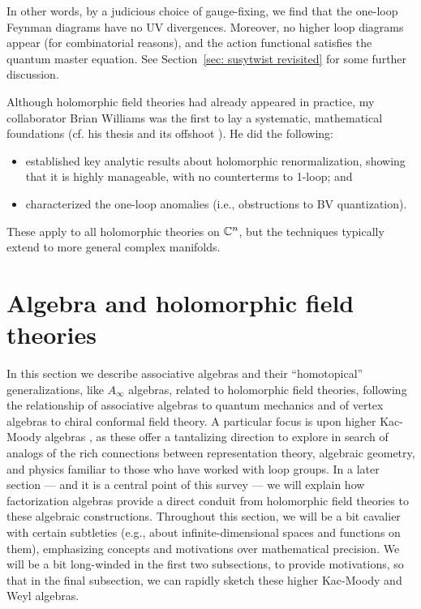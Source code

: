 \documentclass[11pt]{amsart}
\begin{document}
In other words, by a judicious choice of gauge-fixing, 
we find that the one-loop Feynman diagrams have no UV divergences.
Moreover, no higher loop diagrams appear (for combinatorial reasons),
and the action functional satisfies the quantum master equation.
See Section~\ref{sec: susytwist revisited} for some further discussion.

Although holomorphic field theories had already appeared in practice,
my collaborator Brian Williams was the first to lay a systematic, mathematical foundations (cf. his thesis \cite{BWthesis} and its offshoot \cite{BWhol}).
He did the following:
\begin{itemize}
\item established key analytic results about holomorphic renormalization, 
showing that it is highly manageable, with no counterterms to 1-loop; and
\item characterized the one-loop anomalies  (i.e., obstructions to BV quantization).
\end{itemize}
These apply to all holomorphic theories on $\mathbb C^n$,
but the techniques typically extend to more general complex manifolds.


\section{Algebra and holomorphic field theories}
\label{sec: algebra}

In this section we describe  associative algebras and their ``homotopical'' generalizations, like $A_\infty$ algebras, related to holomorphic field theories,
following the relationship of associative algebras to quantum mechanics and of vertex algebras to chiral conformal field theory.
A particular focus is upon higher Kac-Moody algebras \cite{FHK},
as these offer a tantalizing direction to explore in search of analogs of the rich connections between representation theory, algebraic geometry, and physics familiar to those who have worked with loop groups.
In a later section --- and it is a central point of this survey --- we will explain how factorization algebras provide a direct conduit from holomorphic field theories to these algebraic constructions.
Throughout this section, we will be a bit cavalier with certain subtleties (e.g., about infinite-dimensional spaces and functions on them), 
emphasizing concepts and motivations over mathematical precision.
We will be a bit long-winded in the first two subsections, to provide motivations,
so that in the final subsection, we can rapidly sketch these higher Kac-Moody and Weyl algebras.
\end{document}
